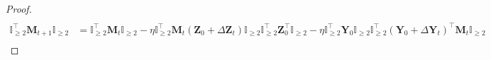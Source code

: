 \documentclass{article}
\theoremstyle{plain}
\theoremstyle{remark}
\def\bY{\mathbf{Y}}
\def\bZ{\mathbf{Z}}
\newcommand{\cc}[1]{\text{\ding{\number\numexpr#1 + 171\relax}}}
\newcommand{\cbb}[1]{\noindent{\color{blue}{#1}}}  %
\newcommand{\crr}[1]{\noindent{\color{red}{#1}}}  %
\begin{document}
\begin{proof}
\begin{align*}
        \end{align*}
% 
% 
        \begin{align*}
        \mathbb{I}_{\ge2}^\top\mathbf{M}_{t+1} \mathbb{I}_{\ge2}
        &=
        \mathbb{I}_{\ge2}^\top\mathbf{M}_{t}\mathbb{I}_{\ge2} - \eta\mathbb{I}_{\ge 2}^\top \mathbf{M}_{t} (\bZ_0+\Delta\bZ_t)\mathbb{I}_{\ge 2}\mathbb{I}_{\ge2}^\top \bZ_0^\top\mathbb{I}_{\ge2} - \eta \mathbb{I}_{\ge2}^\top \bY_0 \mathbb{I}_{\ge2}\mathbb{I}_{\ge 2}^\top \left(\bY_0+\Delta\bY_t\right)^\top \mathbf{M}_{t} \mathbb{I}_{\ge 2}  \\

\end{align*}
\end{proof}
\end{document}
